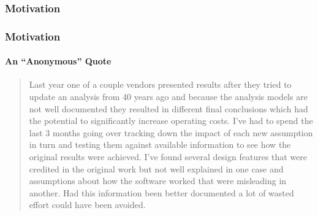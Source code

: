 \documentclass{beamer}
\begin{document}

\begin{frame}[label=motivation]

\frametitle{Motivation}
\begin{center}
\end{center}

\end{frame}


\begin{frame}[fragile]

\frametitle{Motivation} %
\framesubtitle{An ``Anonymous'' Quote}
{\fontsize{8}{10}
\begin{quotation}
  Last year one of a couple vendors presented results after they tried to update
  an analysis from 40 years ago and because the analysis models are not well
  documented they resulted in different final conclusions which had the
  potential to significantly increase operating costs.  I've had to spend the
  last 3 months going over tracking down the impact of each new assumption in
  turn and testing them against available information to see how the original
  results were achieved.  I've found several design features that were credited
  in the original work but not well explained in one case and assumptions about
  how the software worked that were misleading in another.  Had this information
  been better documented a lot of wasted effort could have been avoided.
\end{quotation}}
\end{frame}
\end{document}
